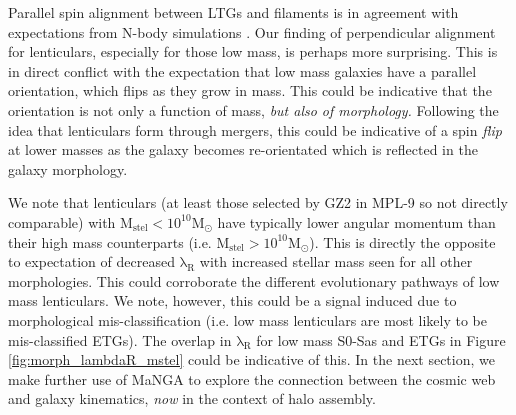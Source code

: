 Parallel spin alignment between LTGs and filaments is in agreement with expectations from N-body simulations \citep[e.g.][]{laigle2015}. Our finding of perpendicular alignment for lenticulars, especially for those low mass, is perhaps more surprising. This is in direct conflict with the expectation that low mass galaxies have a parallel orientation, which flips as they grow in mass. This could be indicative that the orientation is not only a function of mass, \textit{but also of morphology.} Following the idea that lenticulars form through mergers, this could be indicative of a spin \textit{flip} at lower masses as the galaxy becomes re-orientated which is reflected in the galaxy morphology. 

We note that lenticulars (at least those selected by GZ2 in MPL-9 so not directly comparable) with $\mathrm{M_{stel} < 10^{10}M_{\odot}}$ have typically lower angular momentum than their high mass counterparts (i.e. $\mathrm{M_{stel} > 10^{10}M_{\odot}}$). This is directly the opposite to expectation of decreased $\mathrm{\lambda_R}$ with increased stellar mass seen for all other morphologies. This could corroborate the different evolutionary pathways of low mass lenticulars. We note, however, this could be a signal induced due to morphological mis-classification (i.e. low mass lenticulars are most likely to be mis-classified ETGs). The overlap in $\mathrm{\lambda_R}$ for low mass S0-Sas and ETGs in Figure \ref{fig:morph_lambdaR_mstel} could be indicative of this. In the next section, we make further use of MaNGA to explore the connection between the cosmic web and galaxy kinematics, \textit{now} in the context of halo assembly.
